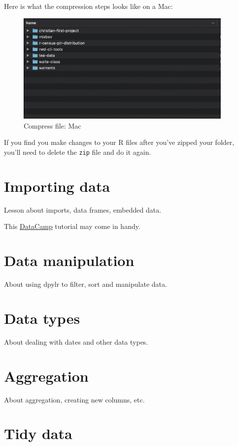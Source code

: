 \documentclass[]{book}
\begin{document}
Here is what the compression steps looks like on a Mac:

\begin{figure}
\centering
\includegraphics[width=4.16667in]{_images/02-rstudio-compress.gif}
\caption{Compress file: Mac}
\end{figure}

If you find you make changes to your R files after you've zipped your
folder, you'll need to delete the \texttt{zip} file and do it again.

\chapter{Importing data}\label{import}

Lesson about imports, data frames, embedded data.

This
\href{https://www.datacamp.com/community/tutorials/r-data-import-tutorial\#spss}{DataCamp}
tutorial may come in handy.

\chapter{Data manipulation}\label{manipulation}

About using dpylr to filter, sort and manipulate data.

\chapter{Data types}\label{datatypes}

About dealing with dates and other data types.

\chapter{Aggregation}\label{aggregation}

About aggregation, creating new columns, etc.

\chapter{Tidy data}\label{tidy}
\end{document}
